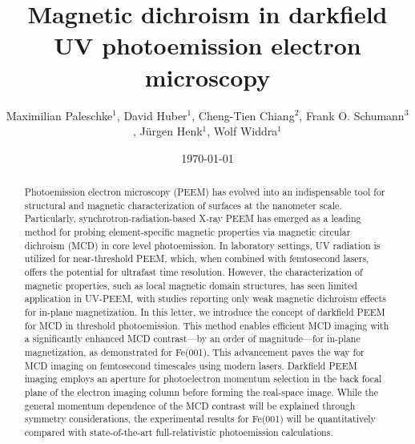 \documentclass[prl,twocolumn,floatfix]{revtex4-2}
\begin{document}
\title{Magnetic dichroism in darkfield UV photoemission electron microscopy}
\author{Maximilian Paleschke$^{1}$, David Huber$^{1}$, Cheng-Tien Chiang$^2$, Frank O. Schumann$^3$, Jürgen Henk$^1$, Wolf Widdra$^1$}





\date{\today}

\begin{abstract}
    Photoemission electron microscopy (PEEM) has evolved into an indispensable tool for structural and magnetic characterization of surfaces at the nanometer scale. Particularly, synchrotron-radiation-based X-ray PEEM has emerged as a leading method for probing element-specific magnetic properties via magnetic circular dichroism (MCD) in core level photoemission. In laboratory settings, UV radiation is utilized for near-threshold PEEM, which, when combined with femtosecond lasers, offers the potential for ultrafast time resolution. However, the characterization of magnetic properties, such as local magnetic domain structures, has seen limited application in UV-PEEM, with studies reporting only weak magnetic dichroism effects for in-plane magnetization. 
    In this letter, we introduce the concept of darkfield PEEM for MCD in threshold photoemission. This method enables efficient MCD imaging with a significantly enhanced MCD contrast—by an order of magnitude—for in-plane magnetization, as demonstrated for Fe(001). This advancement paves the way for MCD imaging on femtosecond timescales using modern lasers. Darkfield PEEM imaging employs an aperture for photoelectron momentum selection in the back focal plane of the electron imaging column before forming the real-space image. While the general momentum dependence of the MCD contrast will be explained through symmetry considerations, the experimental results for Fe(001) will be quantitatively compared with state-of-the-art full-relativistic photoemission calculations.
\end{abstract}

\pacs{}

\maketitle
\end{document}
